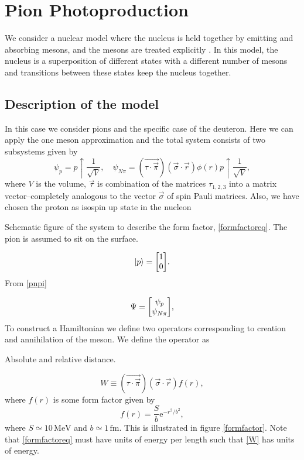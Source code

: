 \chapter{Pion Photoproduction}\label{Decsofmodel}
We consider a nuclear model where the nucleus is held together by emitting and absorbing mesons, and the mesons are treated explicitly \cite[]{Mesons}. In this model, the nucleus is a superposition of different states with a different number of mesons and transitions between these states keep the nucleus together. 

\section{Description of the model}\label{sec:model}
In this case we consider pions and the specific case of the deuteron. Here we can apply the one meson approximation and the total system consists of two subsystems given by
\begin{equation}\label{pnpi}
    \psi_p = p\uparrow\frac{1}{\sqrt{V}}, \quad \psi_{N\pi}=(\vec{\tau\cdot\vec{\pi}})(\vec{\sigma}\cdot\vec{r})\phi(r)p\uparrow\frac{1}{\sqrt{V}},
\end{equation}
where $V$ is the volume, $\vec{\tau}$ is combination of the matrices $\tau_{1,2,3}$ into a matrix vector--completely analogous to the vector $\vec{\sigma}$ of spin Pauli matrices. Also, we have chosen the proton as isospin up state in the nucleon
\begin{marginfigure}
\centering

\caption{Schematic figure of the system to describe the form factor, \eqref{formfactoreq}. The pion is assumed to sit on the surface.}
\label{formfactor}
\end{marginfigure}
\begin{equation}
    \ket{p} = \mqty[1 \\ 0].
\end{equation}
From \eqref{pnpi}

\begin{equation} \label{wavefunc}
    \Psi = \mqty[\psi_p \\ \psi_{N\pi}],
\end{equation}
To construct a Hamiltonian we define two operators corresponding to creation and annihilation of the meson. We define the operator as 
\begin{marginfigure}
\centering

\caption{Absolute and relative distance.}
\label{relativecoordinate}
\end{marginfigure}
\begin{equation} \label{W}
    W \equiv (\vec{\tau\cdot\vec{\pi}})(\vec{\sigma}\cdot\vec{r})f(r),
\end{equation}
where $f(r)$ is some form factor given by
\begin{equation}\label{formfactoreq}
    f(r) = \frac{S}{b} \text{e}^{-r^2/b^2},
\end{equation}
where $S\simeq 10 \, \text{MeV}$  and $b\simeq 1 \, \text{fm}$. This is illustrated in figure \ref{formfactor}. Note that \eqref{formfactoreq} must have units of energy per length such that \eqref{W} has units of energy. 


